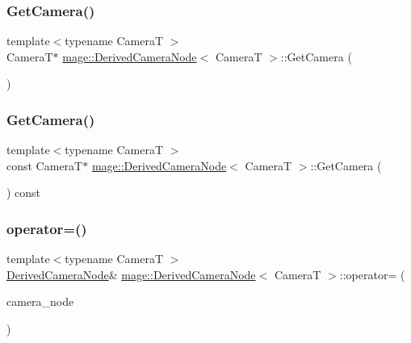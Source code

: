 \subsubsection{\texorpdfstring{Get\+Camera()}{GetCamera()}\hspace{0.1cm}{\footnotesize\ttfamily [1/2]}}
{\footnotesize\ttfamily template$<$typename CameraT $>$ \\
CameraT$\ast$ \hyperlink{classmage_1_1_derived_camera_node}{mage\+::\+Derived\+Camera\+Node}$<$ CameraT $>$\+::Get\+Camera (\begin{DoxyParamCaption}{ }\end{DoxyParamCaption})\hspace{0.3cm}{\ttfamily [noexcept]}}

\hypertarget{classmage_1_1_derived_camera_node_aef2db8d343aeebc95c433150e234481a}{}\label{classmage_1_1_derived_camera_node_aef2db8d343aeebc95c433150e234481a} 
\subsubsection{\texorpdfstring{Get\+Camera()}{GetCamera()}\hspace{0.1cm}{\footnotesize\ttfamily [2/2]}}
{\footnotesize\ttfamily template$<$typename CameraT $>$ \\
const CameraT$\ast$ \hyperlink{classmage_1_1_derived_camera_node}{mage\+::\+Derived\+Camera\+Node}$<$ CameraT $>$\+::Get\+Camera (\begin{DoxyParamCaption}{ }\end{DoxyParamCaption}) const\hspace{0.3cm}{\ttfamily [noexcept]}}

\hypertarget{classmage_1_1_derived_camera_node_a827c7952e061c6e12e38fff12585b3b3}{}\label{classmage_1_1_derived_camera_node_a827c7952e061c6e12e38fff12585b3b3} 
\subsubsection{\texorpdfstring{operator=()}{operator=()}\hspace{0.1cm}{\footnotesize\ttfamily [1/2]}}
{\footnotesize\ttfamily template$<$typename CameraT $>$ \\
\hyperlink{classmage_1_1_derived_camera_node}{Derived\+Camera\+Node}\& \hyperlink{classmage_1_1_derived_camera_node}{mage\+::\+Derived\+Camera\+Node}$<$ CameraT $>$\+::operator= (\begin{DoxyParamCaption}\item[{const \hyperlink{classmage_1_1_derived_camera_node}{Derived\+Camera\+Node}$<$ CameraT $>$ \&}]{camera\+\_\+node }\end{DoxyParamCaption})\hspace{0.3cm}{\ttfamily [delete]}}

